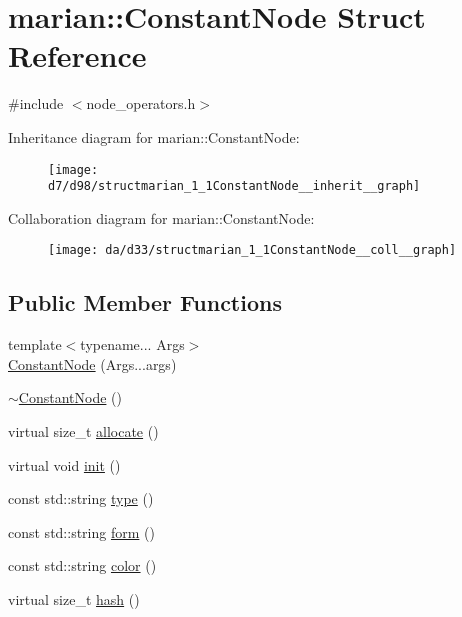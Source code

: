 \hypertarget{structmarian_1_1ConstantNode}{}\section{marian\+:\+:Constant\+Node Struct Reference}
\label{structmarian_1_1ConstantNode}


{\ttfamily \#include $<$node\+\_\+operators.\+h$>$}



Inheritance diagram for marian\+:\+:Constant\+Node\+:
\nopagebreak
\begin{figure}[H]
\begin{center}
\leavevmode
\texttt{[image: d7/d98/structmarian\_1\_1ConstantNode\_\_inherit\_\_graph]}
\end{center}
\end{figure}


Collaboration diagram for marian\+:\+:Constant\+Node\+:
\nopagebreak
\begin{figure}[H]
\begin{center}
\leavevmode
\texttt{[image: da/d33/structmarian\_1\_1ConstantNode\_\_coll\_\_graph]}
\end{center}
\end{figure}
\subsection*{Public Member Functions}
\begin{DoxyCompactItemize}
\item 
{\footnotesize template$<$typename... Args$>$ }\\\hyperlink{structmarian_1_1ConstantNode_a4e5ecee829c85dde0820e1d7b01820c6}{Constant\+Node} (Args...\+args)
\item 
\hyperlink{structmarian_1_1ConstantNode_ab0524f64931fd40abc67720f48e3f6ca}{$\sim$\+Constant\+Node} ()
\item 
virtual size\+\_\+t \hyperlink{structmarian_1_1ConstantNode_ae86ec3d578ec6288453ffd6393ffc812}{allocate} ()
\item 
virtual void \hyperlink{structmarian_1_1ConstantNode_a5c1241fba007195c72b828073689e9b2}{init} ()
\item 
const std\+::string \hyperlink{structmarian_1_1ConstantNode_ac83eb6772734df9119de9dd6a3d4672b}{type} ()
\item 
const std\+::string \hyperlink{structmarian_1_1ConstantNode_a7a26bbfe4c964f9b2380270c88c62f6b}{form} ()
\item 
const std\+::string \hyperlink{structmarian_1_1ConstantNode_ae6c4dd1a5cf3b9fa6371e6e67a9f0013}{color} ()
\item 
virtual size\+\_\+t \hyperlink{structmarian_1_1ConstantNode_ab85566eb0da3759e9c3ae91b9d229ac5}{hash} ()
\end{DoxyCompactItemize}
